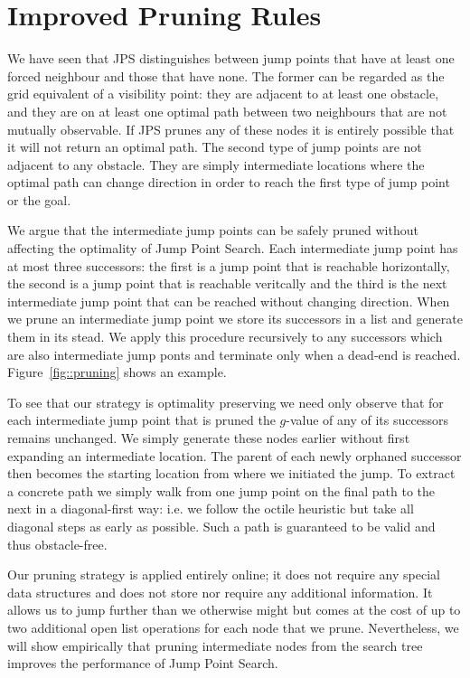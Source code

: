 \section{Improved Pruning Rules}
\label{sec::pruning}
We have seen that JPS distinguishes between jump points that have at least 
one forced neighbour and those that have none.
The former can be regarded as
the grid equivalent of a visibility point: they are adjacent to at least one
obstacle, and they are on at least one optimal path between two neighbours
that are not mutually observable. If JPS prunes any of these nodes it is
entirely possible that it will not return an optimal path.  The second type of
jump points are not adjacent to any obstacle. They are simply intermediate
locations where the optimal path can change direction in order to reach the
first type of jump point or the goal.
\par
We argue that the intermediate jump points can be safely pruned without
affecting the optimality of Jump Point Search.  
Each intermediate jump point has at most three successors: the first is a jump 
point that is reachable horizontally, the second is a jump point that is reachable 
veritcally and the third is the next intermediate jump point that can be reached 
without changing direction.
When we prune an intermediate jump point we store its successors in a list and
generate them in its stead. We apply this procedure recursively to any
successors which are also intermediate jump ponts and terminate only when a
dead-end is reached. Figure~\ref{fig::pruning} shows an example.

To see that our strategy is optimality preserving we need only observe that
for each intermediate jump point that is pruned the $g$-value of any of its
successors remains unchanged. We simply generate these nodes earlier without
first expanding an intermediate location.  The parent of each newly orphaned
successor then becomes the starting location from where we initiated the jump. To
extract a concrete path we simply walk from one jump point on the final
path to the next in a diagonal-first way: i.e. we follow the octile heuristic but 
take all diagonal steps as early as possible. Such a path is guaranteed to be 
valid and thus obstacle-free.

Our pruning strategy is applied entirely online; it does not require any
special data structures and does not store nor require any additional
information.  It allows us to jump further than we otherwise might but comes
at the cost of up to two additional open list operations for each node that we
prune. Nevertheless, we will show empirically that pruning intermediate nodes
from the search tree improves the performance of Jump Point Search.

